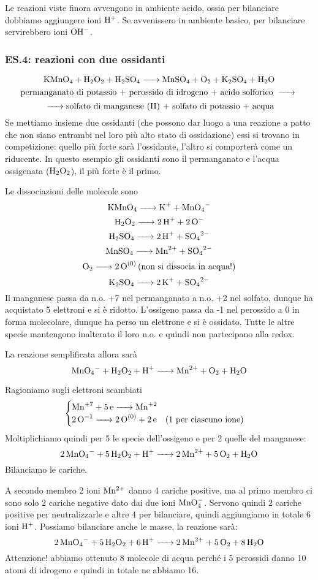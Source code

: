 \vspace{0.2cm}Le reazioni viste finora avvengono in ambiente acido, ossia per bilanciare dobbiamo aggiungere ioni $\rm H^+$. Se avvenissero in ambiente basico, per bilanciare servirebbero ioni $\rm OH^-$.
\subsubsection{\textbf{ES.4: reazioni con due ossidanti}}
$$\ce{KMnO_4 + H_2O_2 + H_2SO_4 -> MnSO_4 + O_2 + K_2SO_4 + H_2O}$$
$$\text{permanganato di potassio + perossido di idrogeno + acido solforico }\ce{->}$$
$$\ce{->}\text{solfato di manganese (II) + solfato di potassio + acqua}$$
Se mettiamo insieme due ossidanti (che possono dar luogo a una reazione a patto che non siano entrambi nel loro più alto stato di ossidazione) essi si trovano in competizione: quello più forte sarà l'ossidante, l'altro si comporterà come un riducente. In questo esempio gli ossidanti sono il permanganato e l'acqua ossigenata ($\rm H_2O_2$), il più forte è il primo.

Le dissociazioni delle molecole sono
$$\ce{KMnO_4 -> K+ + MnO_4-}$$
$$\ce{H_2O_2 -> 2H+ + 2O-}$$
$$\ce{H_2SO_4 -> 2H+ + SO_4^2-}$$
$$\ce{MnSO_4 -> Mn^2+ + SO_4^2-}$$
$$\ce{O_2 -> 2O^{(0)} \text{(non si dissocia in acqua!)}}$$
$$\ce{K_2SO_4 -> 2K+ + SO_4^2-}$$
Il manganese passa da n.o. +7 nel permanganato a n.o. +2 nel solfato, dunque ha acquistato 5 elettroni e si è ridotto. L'ossigeno passa da -1 nel perossido a 0 in forma molecolare, dunque ha perso un elettrone e si è ossidato. Tutte le altre specie mantengono inalterato il loro n.o. e quindi non partecipano alla redox.

La reazione semplificata allora sarà
$$\ce{MnO_4- + H_2O_2 + H+ -> Mn^2+ + O_2 + H_2O}$$

Ragioniamo sugli elettroni scambiati
$$\begin{cases}
    \ce{Mn^{+7} +5e -> Mn^{+2}}\\
    \ce{2O^{-1} -> 2O^{(0)} +2e} \quad \text{(1 per ciascuno ione)}
\end{cases}$$
Moltiplichiamo quindi per 5 le specie dell'ossigeno e per 2 quelle del manganese:
$$\ce{2MnO_4- + 5H_2O_2 + H+ -> 2Mn^2+ + 5O_2 + H_2O}$$
Bilanciamo le cariche.

A secondo membro 2 ioni $\rm Mn^{2+}$ danno 4 cariche positive, ma al primo membro ci sono solo 2 cariche negative dato dai due ioni $\rm MnO_4^-$. Servono quindi 2 cariche positive per neutralizzarle e altre 4 per bilanciare, quindi aggiungiamo in totale 6 ioni $\rm H^+$. Possiamo bilanciare anche le masse, la reazione sarà:
$$\ce{2MnO_4- + 5H_2O_2 + 6H+ -> 2Mn^2+ + 5O_2 + 8H_2O}$$
Attenzione! abbiamo ottenuto 8 molecole di acqua perché i 5 perossidi danno 10 atomi di idrogeno e quindi in totale ne abbiamo 16.

